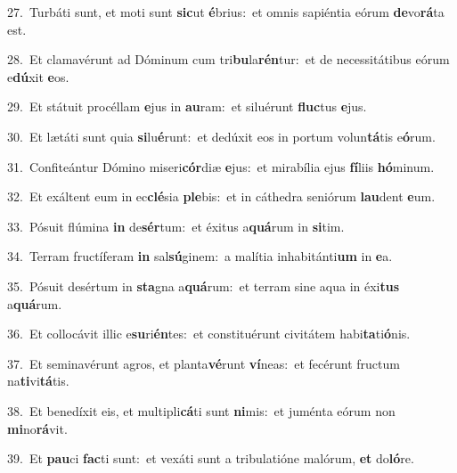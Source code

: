 {\numbfont\textcolor{\numbcolor}{27.}}~Turbáti sunt, et moti sunt \textbf{sic}\-ut \textbf{é}\-brius:~\star et omnis sapiéntia eórum \textbf{de}\-vo\-\textbf{rá}\-ta est.\par
{\numbfont\textcolor{\numbcolor}{28.}}~Et clamavérunt ad Dóminum cum tri\-\textbf{bu}\-la\-\textbf{rén}\-tur:~\star et de necessitátibus eórum e\-\textbf{dú}\-xit \textbf{e}\-os.\par
{\numbfont\textcolor{\numbcolor}{29.}}~Et státuit procéllam \textbf{e}\-jus in \textbf{au}\-ram:~\star et siluérunt \textbf{fluc}\-tus \textbf{e}\-jus.\par
{\numbfont\textcolor{\numbcolor}{30.}}~Et lætáti sunt quia \textbf{si}\-lu\-\textbf{é}\-runt:~\star et dedúxit eos in portum volun\-\textbf{tá}\-tis e\-\textbf{ó}\-rum.\par
{\numbfont\textcolor{\numbcolor}{31.}}~Confiteántur Dómino miseri\-\textbf{cór}\-diæ \textbf{e}\-jus:~\star et mirabília ejus \textbf{fí}\-liis \textbf{hó}\-minum.\par
{\numbfont\textcolor{\numbcolor}{32.}}~Et exáltent eum in ec\-\textbf{clé}\-sia \textbf{ple}\-bis:~\star et in cáthedra seniórum \textbf{lau}\-dent \textbf{e}\-um.\par
{\numbfont\textcolor{\numbcolor}{33.}}~Pósuit flúmina \textbf{in} de\-\textbf{sér}\-tum:~\star et éxitus a\-\textbf{quá}\-rum in \textbf{si}\-tim.\par
{\numbfont\textcolor{\numbcolor}{34.}}~Terram fructíferam \textbf{in} sal\-\textbf{sú}\-ginem:~\star a malítia inhabitánti\textbf{um} in \textbf{e}\-a.\par
{\numbfont\textcolor{\numbcolor}{35.}}~Pósuit desértum in \textbf{sta}\-gna a\-\textbf{quá}\-rum:~\star et terram sine aqua in éxi\textbf{tus} a\-\textbf{quá}\-rum.\par
{\numbfont\textcolor{\numbcolor}{36.}}~Et collocávit illic e\-\textbf{su}\-ri\-\textbf{én}\-tes:~\star et constituérunt civitátem habi\-\textbf{ta}\-ti\-\textbf{ó}\-nis.\par
{\numbfont\textcolor{\numbcolor}{37.}}~Et seminavérunt agros, et planta\-\textbf{vé}\-runt \textbf{ví}\-neas:~\star et fecérunt fructum na\-\textbf{ti}\-vi\-\textbf{tá}\-tis.\par
{\numbfont\textcolor{\numbcolor}{38.}}~Et benedíxit eis, et multipli\-\textbf{cá}\-ti sunt \textbf{ni}\-mis:~\star et juménta eórum non \textbf{mi}\-no\-\textbf{rá}\-vit.\par
{\numbfont\textcolor{\numbcolor}{39.}}~Et \textbf{pau}\-ci \textbf{fac}\-ti sunt:~\star et vexáti sunt a tribulatióne malórum, \textbf{et} do\-\textbf{ló}\-re.\par
